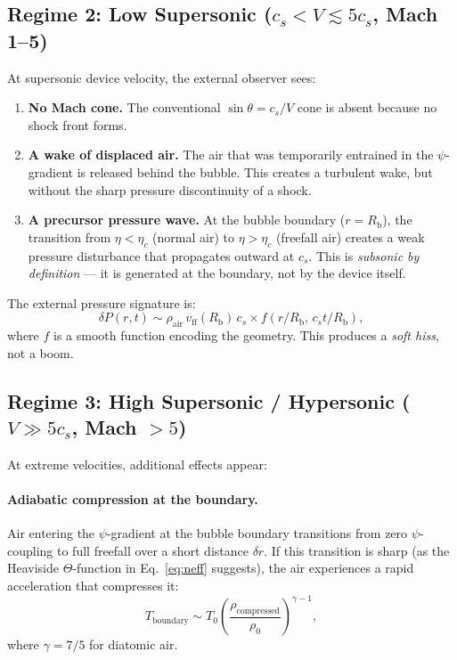 \documentclass[12pt, letterpaper]{article}
\theoremstyle{definition}
\theoremstyle{remark}
\newcommand{\etac}{\eta_c}
\newcommand{\Rbub}{R_{\mathrm{b}}}
\newcommand{\cs}{c_s}
\begin{document}
\subsection{Regime 2: Low Supersonic ($\cs < V \lesssim 5\cs$, Mach 1--5)}

At supersonic device velocity, the external observer sees:
\begin{enumerate}
\item \textbf{No Mach cone.} The conventional $\sin\theta = \cs/V$ cone is
absent because no shock front forms.
\item \textbf{A wake of displaced air.} The air that was temporarily entrained
in the $\psi$-gradient is released behind the bubble. This creates a turbulent
wake, but without the sharp pressure discontinuity of a shock.
\item \textbf{A precursor pressure wave.} At the bubble boundary ($r = \Rbub$),
the transition from $\eta < \etac$ (normal air) to $\eta > \etac$ (freefall
air) creates a weak pressure disturbance that propagates outward at $\cs$.
This is \emph{subsonic by definition} --- it is generated at the boundary, not
by the device itself.
\end{enumerate}

The external pressure signature is:
\begin{equation}
\delta P(r,t) \sim \rho_{\mathrm{air}} \,v_{\mathrm{ff}}(\Rbub)\,\cs
\times f(r/\Rbub, \,\cs t / \Rbub),
\label{eq:pressure-signature}
\end{equation}
where $f$ is a smooth function encoding the geometry. This produces a
\emph{soft hiss}, not a boom.

\subsection{Regime 3: High Supersonic / Hypersonic ($V \gg 5\cs$, Mach $>5$)}

At extreme velocities, additional effects appear:

\paragraph{Adiabatic compression at the boundary.}
Air entering the $\psi$-gradient at the bubble boundary transitions from zero
$\psi$-coupling to full freefall over a short distance $\delta r$. If this
transition is sharp (as the Heaviside $\Theta$-function in Eq.~\eqref{eq:neff}
suggests), the air experiences a rapid acceleration that compresses it:
\begin{equation}
T_{\mathrm{boundary}} \sim T_0 \left(\frac{\rho_{\mathrm{compressed}}}{\rho_0}\right)^{\gamma - 1},
\label{eq:T-boundary}
\end{equation}
where $\gamma = 7/5$ for diatomic air.
\end{document}

